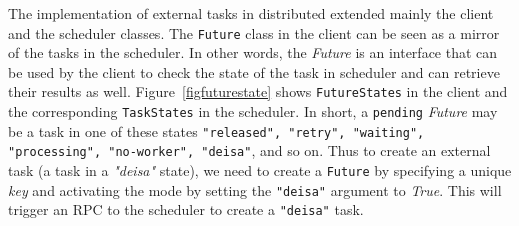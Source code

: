 The implementation of external tasks in \dask distributed extended mainly the client and the scheduler classes. The \texttt{Future} class in the client can be seen as a mirror of the tasks in the scheduler. In other words, the \textit{Future} is an interface that can be used by the client to check the state of the task in \dask scheduler and can retrieve their results as well. Figure~\ref{figfuturestate} shows \texttt{FutureStates} in the client and the corresponding \texttt{TaskStates} in the scheduler. In short, a \texttt{pending} \textit{Future} may be a task in one of these states {\texttt{"released", "retry", "waiting", "processing", "no-worker", "deisa"}}, and so on.  Thus to create an external task (a task in a \textit{"deisa"} state), we need to create a \texttt{Future} by specifying a unique \textit{key} and activating the \deisa mode by setting the \texttt{"deisa"} argument to \textit{True}. This will trigger an RPC to the scheduler to create a \texttt{"deisa"} task. 

